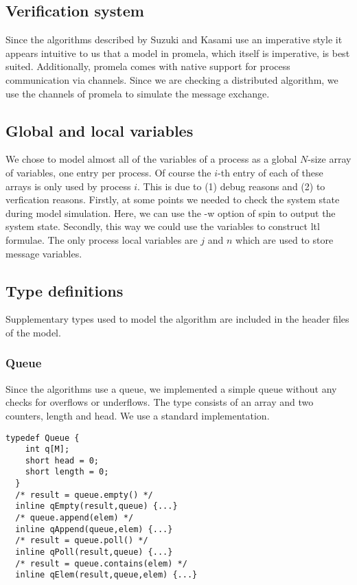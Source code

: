 \documentclass{llncs}
\begin{document}
\subsection{Verification system~\label{ssec:choice}}

Since the algorithms described by Suzuki and Kasami use an imperative style it appears intuitive to us
that a model in promela, which itself is imperative, is best suited. Additionally, promela comes with
native support for process communication via channels. Since we are checking a distributed algorithm,
we use the channels of promela to simulate the message exchange.


\subsection{Global and local variables}

We chose to model almost all of the variables of a process as a global $N$-size array of variables,
one entry per process. Of course the $i$-th entry of each of these arrays is only used by process $i$.
This is due to (1) debug reasons and (2) to verfication reasons. Firstly, at some points we needed to
check the system state during model simulation. Here, we can use the -w option of spin to output the
system state. Secondly, this way we could use the variables to construct ltl formulae.
The only process local variables are $j$ and $n$ which are used to store message variables.

\subsection{Type definitions}
Supplementary types used to model the algorithm are included in the header files of the model.
\subsubsection{Queue}
Since the algorithms use a queue, we implemented a simple queue without any checks for overflows or underflows. The type consists of an array and two counters, length and head. We use a standard implementation.
\begin{lstlisting}[morekeywords={typedef,inline},frame=single]
  typedef Queue {
    int q[M];
    short head = 0;
    short length = 0;
  } 
  /* result = queue.empty() */
  inline qEmpty(result,queue) {...}
  /* queue.append(elem) */
  inline qAppend(queue,elem) {...}
  /* result = queue.poll() */
  inline qPoll(result,queue) {...}
  /* result = queue.contains(elem) */
  inline qElem(result,queue,elem) {...}
\end{lstlisting}
\end{document}
